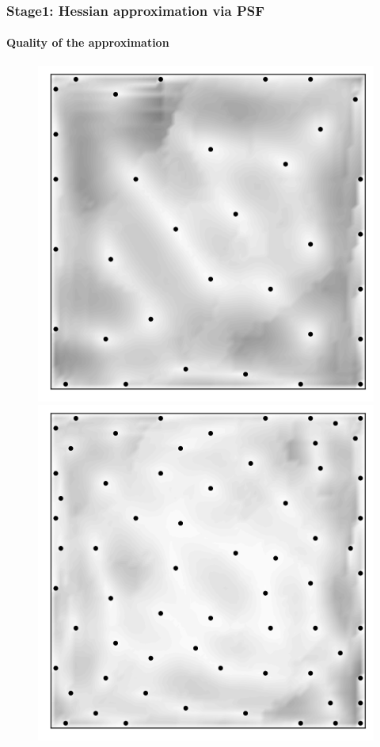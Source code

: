 \documentclass[10pt,final,xcolor=dvipsnames]{beamer}
\begin{document}
\begin{frame}
  \frametitle{Stage1: Hessian approximation via PSF}
  \framesubtitle{Quality of the approximation}
  
  \begin{figure}
    \centering
    \includegraphics[scale=0.35]{localpsf_revised_figures/frog_column_errors_psf5.png}
    \hfill
    \includegraphics[scale=0.35]{localpsf_revised_figures/frog_column_errors_psf10.png}

\end{figure}
\end{frame}
\end{document}
